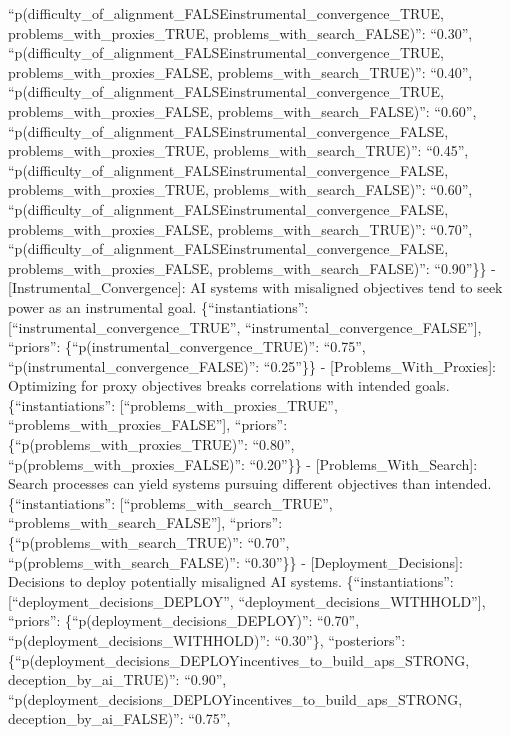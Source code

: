 \documentclass[
  11pt,
  letterpaper,
]{book}
\begin{document}
``p(difficulty\_of\_alignment\_FALSE\textbar instrumental\_convergence\_TRUE,
problems\_with\_proxies\_TRUE, problems\_with\_search\_FALSE)'':
``0.30'',
``p(difficulty\_of\_alignment\_FALSE\textbar instrumental\_convergence\_TRUE,
problems\_with\_proxies\_FALSE, problems\_with\_search\_TRUE)'':
``0.40'',
``p(difficulty\_of\_alignment\_FALSE\textbar instrumental\_convergence\_TRUE,
problems\_with\_proxies\_FALSE, problems\_with\_search\_FALSE)'':
``0.60'',
``p(difficulty\_of\_alignment\_FALSE\textbar instrumental\_convergence\_FALSE,
problems\_with\_proxies\_TRUE, problems\_with\_search\_TRUE)'':
``0.45'',
``p(difficulty\_of\_alignment\_FALSE\textbar instrumental\_convergence\_FALSE,
problems\_with\_proxies\_TRUE, problems\_with\_search\_FALSE)'':
``0.60'',
``p(difficulty\_of\_alignment\_FALSE\textbar instrumental\_convergence\_FALSE,
problems\_with\_proxies\_FALSE, problems\_with\_search\_TRUE)'':
``0.70'',
``p(difficulty\_of\_alignment\_FALSE\textbar instrumental\_convergence\_FALSE,
problems\_with\_proxies\_FALSE, problems\_with\_search\_FALSE)'':
``0.90''\}\} - {[}Instrumental\_Convergence{]}: AI systems with
misaligned objectives tend to seek power as an instrumental goal.
\{``instantiations'': {[}``instrumental\_convergence\_TRUE'',
``instrumental\_convergence\_FALSE''{]}, ``priors'':
\{``p(instrumental\_convergence\_TRUE)'': ``0.75'',
``p(instrumental\_convergence\_FALSE)'': ``0.25''\}\} -
{[}Problems\_With\_Proxies{]}: Optimizing for proxy objectives breaks
correlations with intended goals. \{``instantiations'':
{[}``problems\_with\_proxies\_TRUE'',
``problems\_with\_proxies\_FALSE''{]}, ``priors'':
\{``p(problems\_with\_proxies\_TRUE)'': ``0.80'',
``p(problems\_with\_proxies\_FALSE)'': ``0.20''\}\} -
{[}Problems\_With\_Search{]}: Search processes can yield systems
pursuing different objectives than intended. \{``instantiations'':
{[}``problems\_with\_search\_TRUE'',
``problems\_with\_search\_FALSE''{]}, ``priors'':
\{``p(problems\_with\_search\_TRUE)'': ``0.70'',
``p(problems\_with\_search\_FALSE)'': ``0.30''\}\} -
{[}Deployment\_Decisions{]}: Decisions to deploy potentially misaligned
AI systems. \{``instantiations'': {[}``deployment\_decisions\_DEPLOY'',
``deployment\_decisions\_WITHHOLD''{]}, ``priors'':
\{``p(deployment\_decisions\_DEPLOY)'': ``0.70'',
``p(deployment\_decisions\_WITHHOLD)'': ``0.30''\}, ``posteriors'':
\{``p(deployment\_decisions\_DEPLOY\textbar incentives\_to\_build\_aps\_STRONG,
deception\_by\_ai\_TRUE)'': ``0.90'',
``p(deployment\_decisions\_DEPLOY\textbar incentives\_to\_build\_aps\_STRONG,
deception\_by\_ai\_FALSE)'': ``0.75'',
\end{document}
